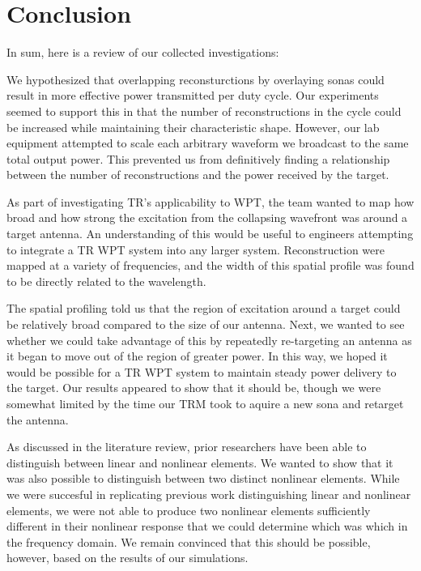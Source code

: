 \chapter{Conclusion}

\label{ch:conclusion}

In sum, here is a review of our collected investigations:

We hypothesized that overlapping reconsturctions by overlaying sonas could result in more effective power transmitted per duty cycle. Our experiments seemed to support this in that the number of reconstructions in the cycle could be increased while maintaining their characteristic shape. However, our lab equipment attempted to scale each arbitrary waveform we broadcast to the same total output power. This prevented us from definitively finding a relationship between the number of reconstructions and the power received by the target.

As part of investigating TR's applicability to WPT, the team wanted to map how broad and how strong the excitation from the collapsing wavefront was around a target antenna. An understanding of this would be useful to engineers attempting to integrate a TR WPT system into any larger system. Reconstruction were mapped at a variety of frequencies, and the width of this spatial profile was found to be directly related to the wavelength.

The spatial profiling told us that the region of excitation around a target could be relatively broad compared to the size of our antenna. Next, we wanted to see whether we could take advantage of this by repeatedly re-targeting an antenna as it began to move out of the region of greater power. In this way, we hoped it would be possible for a TR WPT system to maintain steady power delivery to the target. Our results appeared to show that it should be, though we were somewhat limited by the time our TRM took to aquire a new sona and retarget the antenna.

As discussed in the literature review, prior researchers have been able to distinguish between linear and nonlinear elements. We wanted to show that it was also possible to distinguish between two distinct nonlinear elements. While we were succesful in replicating previous work distinguishing linear and nonlinear elements, we were not able to produce two nonlinear elements sufficiently different in their nonlinear response that we could determine which was which in the frequency domain. We remain convinced that this should be possible, however, based on the results of our simulations.

